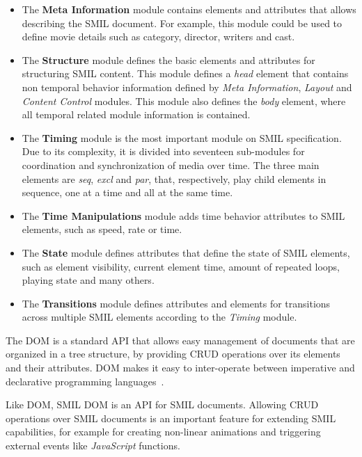 \documentclass[10pt,conference]{IEEEtran}
\begin{document}
\begin{itemize}
  \item The \textbf{Meta Information} module contains elements and attributes that allows describing the \gls{SMIL} document. For example, this module could be used to define movie details such as category, director, writers and cast.

  \item The \textbf{Structure} module defines the basic elements and attributes for structuring \gls{SMIL} content. This module defines a \emph{head} element that contains non temporal behavior information defined by  \emph{Meta Information}, \emph{Layout} and \emph{Content Control} modules. This module also defines the \emph{body} element, where all temporal related module information is contained.

  \item The \textbf{Timing} module is the most important module on \gls{SMIL} specification. Due to its complexity, it is divided into seventeen sub-modules for coordination and synchronization of media over time. The three main elements are \emph{seq}, \emph{excl} and \emph{par}, that, respectively, play child elements in sequence, one at a time and all at the same time. 

  \item The \textbf{Time Manipulations} module adds time behavior attributes to \gls{SMIL} elements, such as speed, rate or time.

  \item The \textbf{State} module defines attributes that define the state of \gls{SMIL} elements, such as element visibility, current element time, amount of repeated loops, playing state and many others.

  \item The \textbf{Transitions} module defines attributes and elements for transitions across multiple \gls{SMIL} elements according to the \emph{Timing} module.

\end{itemize}

The \gls{DOM} is a standard \gls{API} that allows easy management of documents that are organized in a tree structure, by providing \gls{CRUD} operations over its elements and their attributes. \gls{DOM} makes it easy to inter-operate between imperative and declarative programming languages~\cite{dom}.

Like \gls{DOM}, \gls{SMIL} \gls{DOM} is an \gls{API} for \gls{SMIL} documents. Allowing \gls{CRUD} operations over \gls{SMIL} documents is an important feature for extending \gls{SMIL} capabilities, for example for creating non-linear animations and triggering external events like \emph{JavaScript} functions.  
\end{document}
